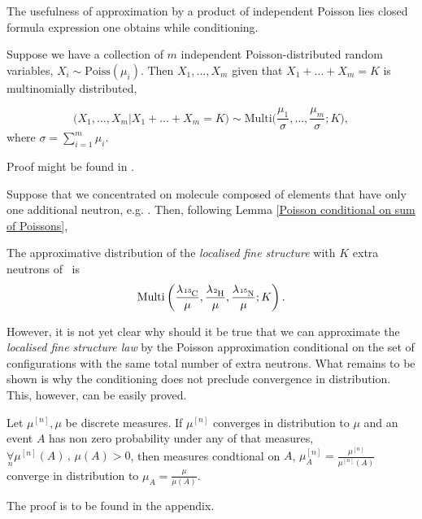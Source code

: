 The usefulness of approximation by a product of independent Poisson lies closed formula expression one obtains while conditioning. 
\begin{lemma}\label{Poisson conditional on sum of Poissons}
	Suppose we have a collection of $m$ independent Poisson-distributed random variables, $X_i \sim \mathrm{Poiss}(\mu_i)$. Then $X_1, \dots, X_m$ given that $X_1 + \dots + X_m = K$ is multinomially distributed,

$$ 
	\Big(X_1, \dots, X_m | X_1 + \dots + X_m = K \Big) 
	\sim 
	\mathrm{Multi}\Big( \frac{\mu_1}{\sigma}, \dots, \frac{\mu_m}{\sigma}; K \Big), 
$$
	where $\sigma = \sum_{i = 1}^m \mu_i$.	
\end{lemma}
Proof might be found in \cite{Kingman1993PoissonProcesses}. 


Suppose that we concentrated on molecule composed of elements that have only one additional neutron, e.g. \smallMolecule. Then, following Lemma \ref{Poisson conditional on sum of Poissons}, 

\begin{result}
 	The approximative distribution of the \emph{ localised fine structure} with $K$ extra neutrons of \smallMolecule\, is 
	\begin{equation}\label{Simple Multinomial Eq}
		\mathrm{Multi}\left(\frac{\lambda_\cem{^{13}C}}{\mu}, \frac{\lambda_\cem{^{2}H}}{\mu}, \frac{\lambda_\cem{^{15}N}}{\mu}; K \right).	
	\end{equation}	
\end{result}

However, it is not yet clear why should it be true that we can approximate the {\it localised fine structure law} by the Poisson approximation conditional on the set of configurations with the same total number of extra neutrons. What remains to be shown is why the conditioning does not preclude convergence in distribution. This, however, can be easily proved.


\begin{lemma}\label{conditional convergence lemma}
	Let $\mu^{[n]}, \mu$ be discrete measures. If $\mu^{[n]}$ converges in distribution to $\mu$ and an event $A$ has non zero probability under any of that measures, $\underset{n}{\forall} \mu^{[n]}(A)\,,\, \mu(A) > 0$, then measures condtional on $A$, $\mu^{[n]}_A = \frac{\mu^{[n]}}{\mu^{[n]}(A)}$ converge in distribution to $\mu_A = \frac{ \mu }{ \mu(A) }$.
\end{lemma}  
The proof is to be found in the appendix. 


